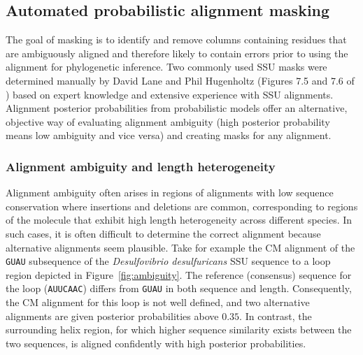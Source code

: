 \subsection{Automated probabilistic alignment masking}

The goal of masking is to identify and remove columns containing
residues that are ambiguously aligned and therefore likely to contain
errors prior to using the alignment for phylogenetic inference.  Two
commonly used SSU masks were determined manually by David Lane and
Phil Hugenholtz (Figures 7.5 and 7.6 of \cite{Nawrocki09b}) based on
expert knowledge and extensive experience with SSU alignments.
Alignment posterior probabilities from
probabilistic models offer an alternative, objective way of evaluating
alignment ambiguity (high posterior probability means low ambiguity
and vice versa) and creating masks for any alignment.

\subsubsection{Alignment ambiguity and length heterogeneity}

Alignment ambiguity often arises in regions of alignments with low
sequence conservation where insertions and deletions are common,
corresponding to regions of the molecule that exhibit high length
heterogeneity across different species. In such cases, it is often
difficult to determine the correct alignment because alternative
alignments seem plausible. Take for example the CM alignment
of the {\tt GUAU} subsequence of the \emph{Desulfovibrio
desulfuricans} SSU sequence to a loop region depicted in
Figure~\ref{fig:ambiguity}. The reference (consensus) sequence for the
loop ({\tt AUUCAAC}) differs from {\tt GUAU} in both sequence and
length. Consequently, the CM alignment for this loop is not well
defined, and two alternative alignments are given posterior
probabilities above $0.35$.  In contrast, the surrounding helix
region, for which higher sequence similarity exists between the two
sequences, is aligned confidently with high posterior probabilities.

